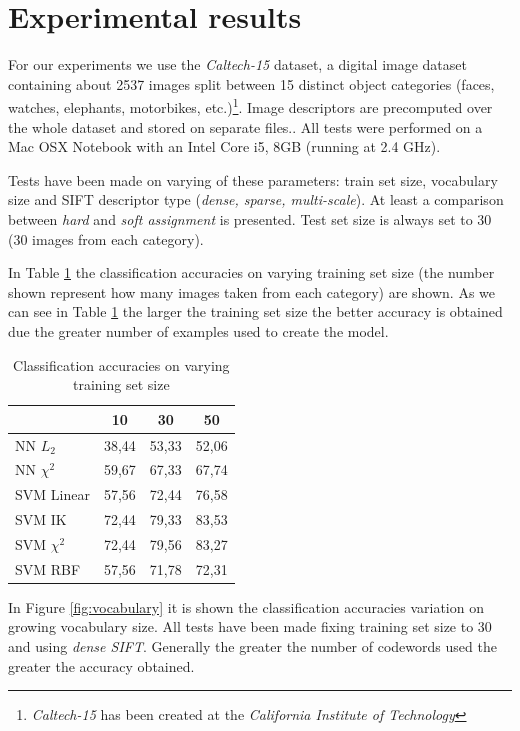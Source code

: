 \section{Experimental results}

For our experiments we use the \emph{Caltech-15} dataset, a digital image dataset containing about 2537 images  split between 15 distinct object categories (faces, watches, elephants, motorbikes, etc.)\footnote{\emph{Caltech-15} has been created at the \emph{California Institute of Technology}}. Image descriptors are precomputed over the whole dataset and stored on separate files.. All tests were performed on a Mac OSX Notebook with an Intel Core i5, 8GB (running at 2.4 GHz).

Tests have been made on varying of these parameters: train set size, vocabulary size and SIFT descriptor type (\emph{dense, sparse, multi-scale}). At least a comparison between \emph{hard} and \emph{soft assignment} is presented. Test set size is always set to 30 (30 images from each category).

In Table \ref{tab:trainsetsize} the classification accuracies on varying training set size (the number shown represent how many images taken from each category) are shown. As we can see in Table \ref{tab:trainsetsize} the larger the training set size the better accuracy is obtained due the greater number of examples used to create the model.

\begin{table}[h]
\begin{center}
\begin{tabular}{|l|c|c|c|}
\hline
 & 10 & 30 & 50\\
\hline\hline
NN $L_2$ & 38,44 & 53,33 & 52,06\\
NN $\chi^2$ & 59,67 & 67,33 & 67,74\\
SVM Linear & 57,56 & 72,44 & 76,58\\
SVM IK & 72,44 & 79,33 & 83,53\\
SVM $\chi^2$ & 72,44 & 79,56 & 83,27\\
SVM RBF & 57,56 & 71,78 & 72,31 \\
\hline
\end{tabular}
\end{center}
\label{tab:trainsetsize}
\caption{Classification accuracies on varying training set size}
\end{table}

In Figure \ref{fig:vocabulary} it is shown the classification accuracies variation on growing vocabulary size. All tests have been made fixing training set size to 30 and using \emph{dense SIFT}. Generally the greater the number of codewords used the greater the accuracy obtained.

